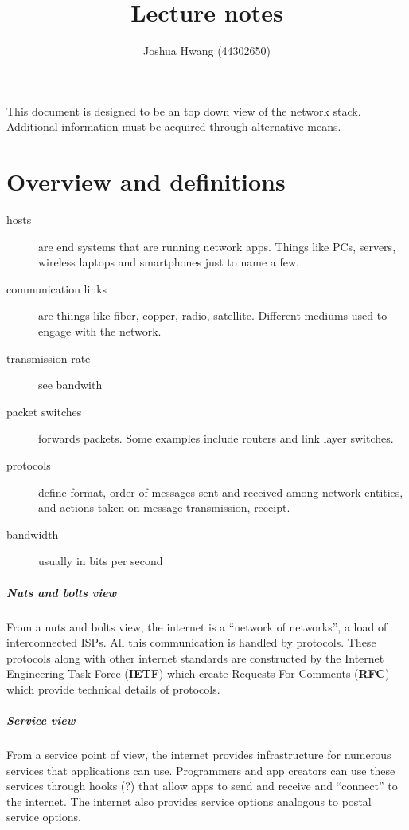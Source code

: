 \documentclass[a4paper, twoside]{book}
\title{Lecture notes}
\author{Joshua Hwang (44302650)}
\begin{document}
\maketitle

This document is designed to be an top down view of the network stack.
Additional information must be acquired through alternative means.

\tableofcontents

\chapter{Overview and definitions}
\begin{description}
    \item [hosts] are end systems that are running network apps. Things like
        PCs, servers, wireless laptops and smartphones just to name a few.
    \item [communication links] are thiings like fiber, copper, radio,
        satellite. Different mediums used to engage with the network.
    \item [transmission rate] see bandwith
    \item [packet switches] forwards packets. Some examples include routers
        and link layer switches.
    \item [protocols] define format, order of messages sent and received
        among network entities, and actions taken on message transmission,
        receipt.
    \item [bandwidth] usually in bits per second
\end{description}

\paragraph{Nuts and bolts view}
From a nuts and bolts view,
the internet is a ``network of networks'', a load of interconnected ISPs.
All this communication is handled by protocols. These protocols along with
other internet standards are constructed by the Internet Engineering Task
Force (\textbf{IETF}) which create Requests For Comments (\textbf{RFC}) which
provide technical details of protocols.

\paragraph{Service view}
From a service point of view, the internet provides infrastructure for
numerous services that applications can use. Programmers and app creators can
use these services through hooks (?) that allow apps to send and receive
and ``connect'' to the internet. The internet also provides service options
analogous to postal service options.
\end{document}
